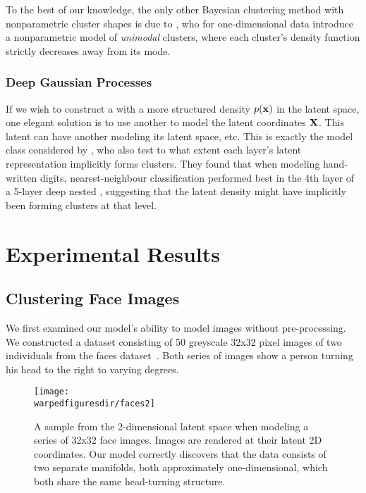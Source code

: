 To the best of our knowledge, the only other Bayesian clustering method with nonparametric cluster shapes is due to \citet{rodriguez2012univariate}, who for one-dimensional data introduce a nonparametric model of \emph{unimodal} clusters, where each cluster's density function strictly decreases away from its mode.


\subsubsection{Deep Gaussian Processes}

If we wish to construct a \gplvm{} with a more structured density $p({\bf{x}})$ in the latent space, one elegant solution is to use another \gplvm{} to model the latent coordinates $\mathbf{X}$.
This latent \gplvm{} can have another \gplvm{} modeling its latent space, etc.
This is exactly the model class considered by \citet{damianou2012deep}, who also test to what extent each layer's latent representation implicitly forms clusters.
They found that when modeling \MNIST{} hand-written digits, nearest-neighbour classification performed best in the 4th layer of a 5-layer deep nested \gplvm{}, suggesting that the latent density might have implicitly been forming clusters at that level.


\section{Experimental Results}
\label{sec:iwmm-experiments}

\subsection{Clustering Face Images}

We first examined our model's ability to model images without pre-processing.
We constructed a dataset consisting of 50 greyscale 32x32 pixel images of two individuals from the \UMIST{} faces dataset~\citep{umistfaces}.
Both series of images show a person turning his head to the right to varying degrees.

\begin{figure}[h!]
\centering
\texttt{[image: \\warpedfiguresdir/faces2]}
\caption[Latent clusters of face images]{A sample from the 2-dimensional latent space when modeling a series of 32x32 face images.
Images are rendered at their latent 2D coordinates.
Our model correctly discovers that the data consists of two separate manifolds, both approximately one-dimensional, which both share the same head-turning structure.}
\label{fig:faces}
\end{figure}

